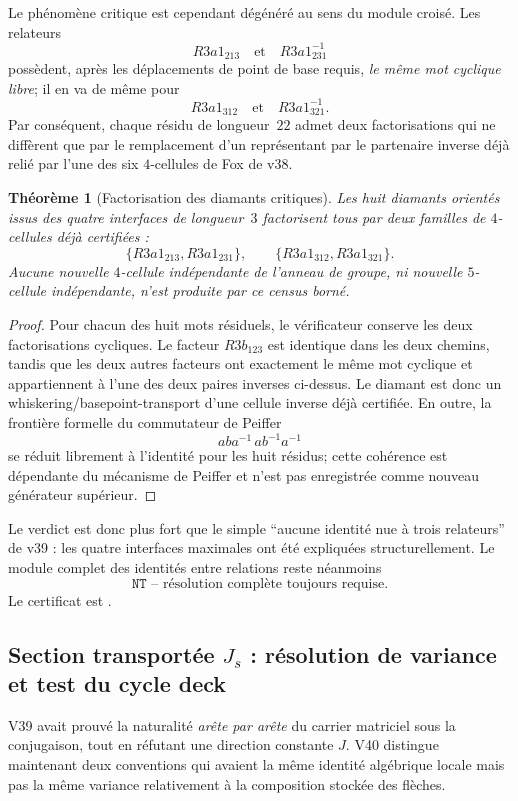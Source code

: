 \documentclass[11pt,a4paper]{article}
\newtheorem{theorem}{Théorème}[section]
\newcommand{\certNT}{\texttt{NT}}
\begin{document}
Le phénomène critique est cependant dégénéré au sens du module croisé. Les relateurs
\[
 R3a1_{213}\quad\text{et}\quad R3a1_{231}^{-1}
\]
possèdent, après les déplacements de point de base requis, \emph{le même mot cyclique libre}; il en va de même pour
\[
 R3a1_{312}\quad\text{et}\quad R3a1_{321}^{-1}.
\]
Par conséquent, chaque résidu de longueur~$22$ admet deux factorisations qui ne diffèrent que par le remplacement d'un représentant par le partenaire inverse déjà relié par l'une des six $4$-cellules de Fox de v38.

\begin{theorem}[Factorisation des diamants critiques]
Les huit diamants orientés issus des quatre interfaces de longueur~$3$ factorisent tous par deux familles de $4$-cellules déjà certifiées :
\[
 \{R3a1_{213},R3a1_{231}\},
 \qquad
 \{R3a1_{312},R3a1_{321}\}.
\]
Aucune nouvelle $4$-cellule indépendante de l'anneau de groupe, ni nouvelle $5$-cellule indépendante, n'est produite par ce census borné.
\end{theorem}
\begin{proof}
Pour chacun des huit mots résiduels, le vérificateur conserve les deux factorisations cycliques. Le facteur $R3b_{123}$ est identique dans les deux chemins, tandis que les deux autres facteurs ont exactement le même mot cyclique et appartiennent à l'une des deux paires inverses ci-dessus. Le diamant est donc un whiskering/basepoint-transport d'une cellule inverse déjà certifiée. En outre, la frontière formelle du commutateur de Peiffer
\[
 a b a^{-1}\, a b^{-1}a^{-1}
\]
se réduit librement à l'identité pour les huit résidus; cette cohérence est dépendante du mécanisme de Peiffer et n'est pas enregistrée comme nouveau générateur supérieur.
\end{proof}

Le verdict est donc plus fort que le simple ``aucune identité nue à trois relateurs'' de v39 : les quatre interfaces maximales ont été expliquées structurellement. Le module complet des identités entre relations reste néanmoins
\[
 \boxed{\certNT\text{ -- résolution complète toujours requise}.}
\]
Le certificat est .

\subsection{Section transportée $J_s$ : résolution de variance et test du cycle deck}

V39 avait prouvé la naturalité \emph{arête par arête} du carrier matriciel sous la conjugaison, tout en réfutant une direction constante $J$. V40 distingue maintenant deux conventions qui avaient la même identité algébrique locale mais pas la même variance relativement à la composition stockée des flèches.
\end{document}

